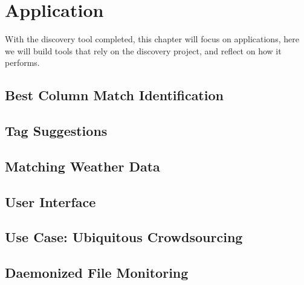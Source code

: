 \chapter{Application}\label{ch:application}
With the discovery tool completed, this chapter will focus on applications, here we will build tools that rely on the
discovery project, and reflect on how it performs.


\section{Best Column Match Identification}\label{sec:best-column-match-id}



\section{Tag Suggestions}\label{sec:tag-suggestions}



\section{Matching Weather Data}\label{sec:matching-weather-data}



\section{User Interface}\label{sec:user-interface}



\section{Use Case: Ubiquitous Crowdsourcing}\label{sec:ubiquitous-crowdsourcing}



\section{Daemonized File Monitoring}

